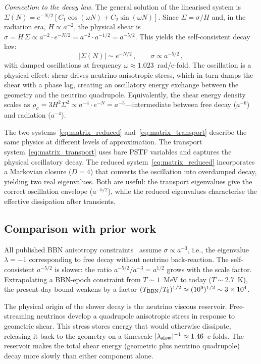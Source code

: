 \documentclass[a4paper,11pt]{article}
\newcommand{\Sig}{\Sigma}
\begin{document}
\textit{Connection to the decay law.}  The general solution of the linearised system is $\Sig(N) = e^{-N/2}[C_1\cos(\omega N) + C_2\sin(\omega N)]$.  Since $\Sig = \sigma/H$ and, in the radiation era, $H \propto a^{-2}$, the physical shear is $\sigma = H\,\Sig \propto a^{-2} \cdot e^{-N/2} = a^{-2} \cdot a^{-1/2} = a^{-5/2}$.  This yields the self-consistent decay law:
\begin{equation}
\boxed{|\Sig(N)| \sim e^{-N/2}\,,\qquad \sigma \propto a^{-5/2}\,,}\label{eq:decay_law}
\end{equation}
with damped oscillations at frequency $\omega \approx 1.023$~rad/e-fold.  The oscillation is a physical effect: shear drives neutrino anisotropic stress, which in turn damps the shear with a phase lag, creating an oscillatory energy exchange between the geometry and the neutrino quadrupole.  Equivalently, the shear energy density scales as $\rho_\sigma = 3H^2\Sig^2 \propto a^{-4}\cdot e^{-N} = a^{-5}$---intermediate between free decay ($a^{-6}$) and radiation ($a^{-4}$).

The two systems~\eqref{eq:matrix_reduced} and~\eqref{eq:matrix_transport} describe the same physics at different levels of approximation.  The transport system~\eqref{eq:matrix_transport} uses bare PSTF variables and captures the physical oscillatory decay.  The reduced system~\eqref{eq:matrix_reduced} incorporates a Markovian closure ($D = 4$) that converts the oscillation into overdamped decay, yielding two real eigenvalues.  Both are useful: the transport eigenvalues give the correct oscillation envelope ($a^{-5/2}$), while the reduced eigenvalues characterise the effective dissipation after transients.

\subsection{Comparison with prior work}

All published BBN anisotropy constraints~\cite{Barrow1976,RothmannMatzner1984,Park2025} assume $\sigma \propto a^{-3}$, i.e., the eigenvalue $\lambda = -1$ corresponding to free decay without neutrino back-reaction.  The self-consistent $a^{-5/2}$ is slower: the ratio $a^{-5/2}/a^{-3} = a^{1/2}$ grows with the scale factor.  Extrapolating a BBN-epoch constraint from $T \sim 1$~MeV to today ($T \sim 2.7$~K), the present-day bound weakens by a factor $(T_{\rm BBN}/T_0)^{1/2} \approx (10^9)^{1/2} \sim 3\times 10^4$.

The physical origin of the slower decay is the neutrino viscous reservoir.  Free-streaming neutrinos develop a quadrupole anisotropic stress in response to geometric shear.  This stress stores energy that would otherwise dissipate, releasing it back to the geometry on a timescale $|\lambda_{\rm slow}|^{-1} \approx 1.46$~e-folds.  The reservoir makes the total shear energy (geometric plus neutrino quadrupole) decay more slowly than either component alone.
\end{document}
